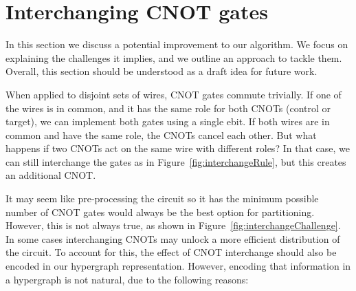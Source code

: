 

\section{Interchanging CNOT gates}
\label{Interchange}

In this section we discuss a potential improvement to our algorithm. We focus on explaining the challenges it implies, and we outline an approach to tackle them. Overall, this section should be understood as a draft idea for future work. 

When applied to disjoint sets of wires, CNOT gates commute trivially. If one of the wires is in common, and it has the same role for both CNOTs (control or target), we can implement both gates using a single ebit. If both wires are in common and have the same role, the CNOTs cancel each other. But what happens if two CNOTs act on the same wire with different roles? In that case, we can still interchange the gates as in Figure~\ref{fig:interchangeRule}, but this creates an additional CNOT.





It may seem like pre-processing the circuit so it has the minimum possible number of CNOT gates would always be the best option for partitioning. However, this is not always true, as shown in Figure~\ref{fig:interchangeChallenge}. In some cases interchanging CNOTs may unlock a more efficient distribution of the circuit. To account for this, the effect of CNOT interchange should also be encoded in our hypergraph representation. However, encoding that information in a hypergraph is not natural, due to the following reasons:

